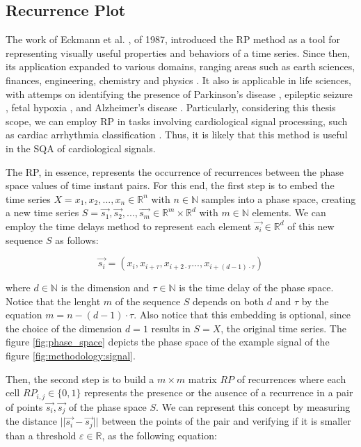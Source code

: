 \subsection{Recurrence Plot}

The work of Eckmann et al. \cite{rp-1}, of 1987, introduced the \gls{RP} method as a tool for representing visually useful properties and behaviors of a time series. Since then, its application expanded to various domains, ranging areas such as earth sciences, finances, engineering, chemistry and physics \cite{rp-2}. It also is applicable in life sciences, with attemps on identifying the presence of Parkinson's disease \cite{rp-3}, epileptic seizure \cite{rp-4}, fetal hypoxia \cite{rp-5}, and Alzheimer's disease \cite{rp-6}. Particularly, considering this thesis scope, we can employ \gls{RP} in tasks involving cardiological signal processing, such as cardiac arrhythmia classification \cite{rp-7}. Thus, it is likely that this method is useful in the \gls{SQA} of cardiological signals.  

The \gls{RP}, in essence, represents the occurrence of recurrences between the phase space values of time instant pairs. For this end, the first step is to embed the time series $X=x_1,x_2,...,x_n \in \mathbb{R}^n$ with $n \in \mathbb{N}$ samples into a phase space, creating a new time series $S=\vec{s_1},\vec{s_2},...,\vec{s_m} \in \mathbb{R}^m \times \mathbb{R}^d$ with $m \in \mathbb{N}$ elements. We can employ the time delays method to represent each element $\vec{s_i} \in \mathbb{R}^d$ of this new sequence $S$ as follows:

\begin{equation}
	\vec{s_i} = (x_i, x_{i + \tau}, x_{i + 2\cdot \tau} ..., x_{i + (d-1) \cdot \tau})
\end{equation}   

\noindent where $d \in \mathbb{N}$ is the dimension and $\tau \in \mathbb{N}$ is the time delay of the phase space. Notice that the lenght $m$ of the sequence $S$ depends on both $d$ and $\tau$ by the equation $m = n - (d-1) \cdot \tau$. Also notice that this embedding is optional, since the choice of the dimension $d=1$ results in $S=X$, the original time series. The figure \ref{fig:phase_space} depicts the phase space of the example signal of the figure \ref{fig:methodology:signal}.



Then, the second step is to build a $m \times m$ matrix $RP$ of recurrences where each cell $RP_{i,j} \in \{0,1\}$ represents the presence or the ausence of a recurrence in a pair of points $\vec{s_i},\vec{s_j}$ of the phase space $S$. We can represent this concept by measuring the distance $||\vec{s_i} - \vec{s_j}||$ between the points of the pair and verifying if it is smaller than a threshold $\varepsilon \in \mathbb{R}$, as the following equation:

